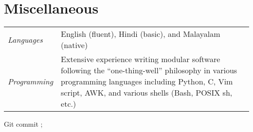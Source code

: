 \documentclass[10pt]{article}
\begin{document}


\section*{Miscellaneous}

\begin{tabular}{@{}p{1in}p{5in}}
  \emph{Languages}   & English (fluent), Hindi (basic), and Malayalam (native)\\
  \emph{Programming} & Extensive experience writing modular software following the ``one-thing-well'' philosophy in various programming languages including Python, C, Vim script, AWK, and various shells (Bash, POSIX sh, etc.)
\end{tabular}


\bigskip
\begin{center}
  \hypersetup{hidelinks}\color{gray}
  Git commit \href{https://github.com/manu-mannattil/vitae/tree/\gitHash}{\texttt{\gitAbbrevHash}}; \gitAuthorIsoDate
\end{center}
\end{document}
